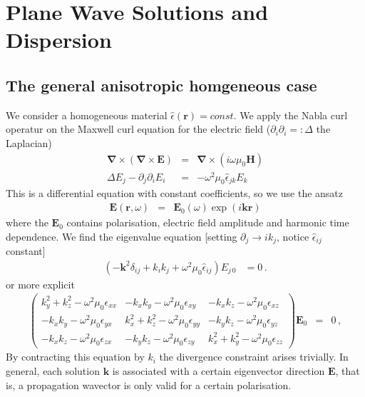 \documentclass[12pt,a4paper,twoside,openright,BCOR10mm,headsepline,titlepage,abstracton,chapterprefix,final]{scrreprt}
\newcommand\Vector[1]{{\mathbf{#1}}}
\newcommand\vacuum{0}
\newcommand\Location{\Vector{r}}
\newcommand\wavenumber{k}
\newcommand\Wavevector{\Vector{\wavenumber}}
\newcommand\Nabla{\Vector{\nabla}}
\newcommand\Tensor[1]{\hat{#1}}
\newcommand\scalarEfield{E}
\newcommand\scalarHfield{H}
\newcommand\Efield{\Vector{\scalarEfield}}
\newcommand\Hfield{\Vector{\scalarHfield}}
\newcommand\vacuumpermeability{\mu_{\vacuum}}
\newcommand\permittivity{\Tensor{\epsilon}}
\newcommand\scalarpermittivity{\epsilon}
\begin{document}
\section{Plane Wave Solutions and Dispersion}
\subsection{The general anisotropic homgeneous case}
We consider a homogeneous material $\permittivity(\Location) = const.$ We apply the Nabla curl operatur on the Maxwell curl equation for the electric field
($\partial_i \partial_i =: \Delta$ the Laplacian)
\begin{eqnarray}
  \Nabla \times ( \Nabla \times \Efield ) &=& \Nabla \times ( i \omega \vacuumpermeability \Hfield ) 
  \\
  \Delta \scalarEfield_j - \partial_j \partial_i \scalarEfield_i &=& - \omega^2 \vacuumpermeability \permittivity_{jk} \scalarEfield_{k}
\end{eqnarray}
This is a differential equation with constant coefficients, so we use the ansatz
\begin{eqnarray}
 \Efield(\Location,\omega) &=& \Efield_0(\omega) \exp(i \Wavevector \Location)
\end{eqnarray}
where the $\Efield_0$ contains polarisation, electric field amplitude and harmonic time dependence. We find the eigenvalue equation [setting $\partial_j \to i k_j$, notice $\permittivity_{ij}$ constant]
\begin{align}
 \left(-\Vector{k}^2 \delta_{ij} + k_i k_j + \omega^2 \mu_0 \permittivity_{ij} \right) E_{j\,0} &= 0 \,.
\end{align}
or more explicit
\begin{eqnarray}
\begin{pmatrix}
 \wavenumber_y^2 + \wavenumber_z^2 - \omega^2 \vacuumpermeability \scalarpermittivity_{xx} 
 &
 - \wavenumber_x \wavenumber_y - \omega^2 \vacuumpermeability \scalarpermittivity_{xy}
 &
 - \wavenumber_x \wavenumber_z - \omega^2 \vacuumpermeability \scalarpermittivity_{xz}
 \\
 - \wavenumber_x \wavenumber_y - \omega^2 \vacuumpermeability \scalarpermittivity_{yx}
 &
 \wavenumber_x^2 + \wavenumber_z^2 - \omega^2 \vacuumpermeability \scalarpermittivity_{yy} 
 &
 - \wavenumber_y \wavenumber_z - \omega^2 \vacuumpermeability \scalarpermittivity_{yz}
 \\
 - \wavenumber_x \wavenumber_z - \omega^2 \vacuumpermeability \scalarpermittivity_{zx}
 &
 - \wavenumber_y \wavenumber_z - \omega^2 \vacuumpermeability \scalarpermittivity_{zy}
 &
 \wavenumber_x^2 + \wavenumber_y^2 - \omega^2 \vacuumpermeability \scalarpermittivity_{zz}  
\end{pmatrix}
\Efield_0
&=& 0\,,
\end{eqnarray}
By contracting this equation by $k_i$ the divergence constraint arises trivially.
In general, each solution $\Wavevector$ is associated with a certain eigenvector direction $\Efield$,
that is, a propagation wavector is only valid for a certain polarisation.
\end{document}
